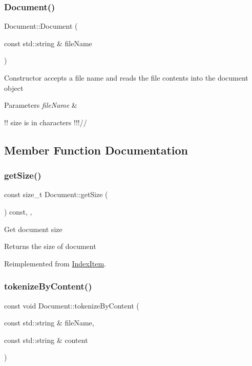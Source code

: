 \subsubsection{\texorpdfstring{Document()}{Document()}\hspace{0.1cm}{\footnotesize\ttfamily [2/2]}}
{\footnotesize\ttfamily Document\+::\+Document (\begin{DoxyParamCaption}\item[{const std\+::string \&}]{file\+Name }\end{DoxyParamCaption})}

Constructor accepts a file name and reads the file contents into the document object 
\begin{DoxyParams}{Parameters}
{\em file\+Name} & \\
\hline
\end{DoxyParams}
!! size is in characters !!!// 

\subsection{Member Function Documentation}
\mbox{\label{classDocument_a81ccfd6f3de713047ccb52a45842dc26}} 
\subsubsection{\texorpdfstring{get\+Size()}{getSize()}}
{\footnotesize\ttfamily const size\+\_\+t Document\+::get\+Size (\begin{DoxyParamCaption}{ }\end{DoxyParamCaption}) const\hspace{0.3cm}{\ttfamily [final]}, {\ttfamily [override]}, {\ttfamily [virtual]}}

Get document size \begin{DoxyReturn}{Returns}
the size of document 
\end{DoxyReturn}


Reimplemented from \hyperlink{classIndexItem_a37bb9320946eedfe8360bc740eb0c11b}{Index\+Item}.

\mbox{\label{classDocument_a9c9a23f1b4651aff6b885c2a69bc76d2}} 
\subsubsection{\texorpdfstring{tokenize\+By\+Content()}{tokenizeByContent()}}
{\footnotesize\ttfamily const void Document\+::tokenize\+By\+Content (\begin{DoxyParamCaption}\item[{const std\+::string \&}]{file\+Name,  }\item[{const std\+::string \&}]{content }\end{DoxyParamCaption})}

